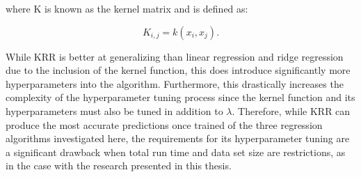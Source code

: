 where K is known as the kernel matrix and is defined as:

\begin{equation} \label{kernel_matrix}
    K_{i,j} = k(x_i, x_j).
\end{equation}



While KRR is better at generalizing than linear regression and ridge regression due to the inclusion of the kernel function, this does introduce significantly more hyperparameters into the algorithm. Furthermore, this drastically increases the complexity of the hyperparameter tuning process since the kernel function and its hyperparameters must also be tuned in addition to $\lambda$. Therefore, while KRR can produce the most accurate predictions once trained of the three regression algorithms investigated here, the requirements for its hyperparameter tuning are a significant drawback when total run time and data set size are restrictions, as in the case with the research presented in this thesis.
